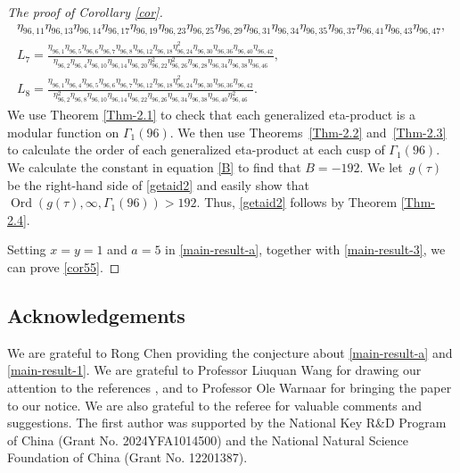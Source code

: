 \documentclass[pdftex]{sigma}
\numberwithin{equation}{section}
\theoremstyle{definition}
\begin{document}
\begin{proof}[The proof of Corollary \ref{cor}]
\begin{gather*}
{\eta_{96,11}\eta_{96,13}\eta_{96,14}\eta_{96,17}\eta_{96,19}\eta_{96,23}\eta_{96,25}\eta_{96,29}\eta_{96,31}\eta_{96,34}\eta_{96,35}\eta_{96,37}\eta_{96,41}\eta_{96,43}\eta_{96,47}},\\
L_7=\frac{\eta_{96,1}\eta_{96,5}\eta_{96,6}\eta_{96,7}\eta_{96,8}\eta_{96,12}\eta_{96,18}\eta^2_{96,24}\eta_{96,30}\eta_{96,36}\eta_{96,40}\eta_{96,42}}{\eta_{96,2}\eta_{96,4}\eta_{96,10}\eta_{96,14}\eta_{96,20}\eta^2_{96,22}\eta^2_{96,26}\eta_{96,28}\eta_{96,34}\eta_{96,38}\eta_{96,46}},\\
L_8=\frac{\eta_{96,1}\eta_{96,4}\eta_{96,5}\eta_{96,6}\eta_{96,7}\eta_{96,12}\eta_{96,18}\eta^2_{96,24}\eta_{96,30}\eta_{96,36}\eta_{96,42}}{\eta^2_{96,2}\eta_{96,8}\eta_{96,10}\eta_{96,14}\eta_{96,22}\eta_{96,26}\eta_{96,34}\eta_{96,38}\eta_{96,40}\eta^2_{96,46}}.
\end{gather*}
We use Theorem \ref{Thm-2.1} to check that each generalized eta-product is a modular function on $\Gamma_1(96)$. We then use Theorems~\ref{Thm-2.2} and~\ref{Thm-2.3} to calculate the order of each generalized eta-product at each cusp of $\Gamma_1(96)$. We calculate the constant in equation \eqref{B} to find that $B=-192$. We let~$g(\tau)$ be the right-hand side of \eqref{getaid2} and easily show that $\operatorname{Ord}(g(\tau),\infty,\Gamma_1(96)) > 192$. Thus, \eqref{getaid2} follows by Theorem \ref{Thm-2.4}.

Setting $x=y=1$ and $a=5$ in \eqref{main-result-a}, together with \eqref{main-result-3}, we can prove \eqref{cor55}.
\end{proof}

\subsection*{Acknowledgements}
We are grateful to Rong Chen providing the conjecture about \eqref{main-result-a} and \eqref{main-result-1}. We are grateful to Professor Liuquan Wang for drawing our attention to the references \cite{Wang-2024, Wang-2024-2}, and to Professor Ole Warnaar for bringing the paper \cite{Warnaar} to our notice. We are also grateful to the referee for valuable comments and suggestions. The first author was supported by the National Key R\&D Program of China (Grant No. 2024YFA1014500) and the National Natural Science Foundation of China (Grant No. 12201387).
\end{document}
